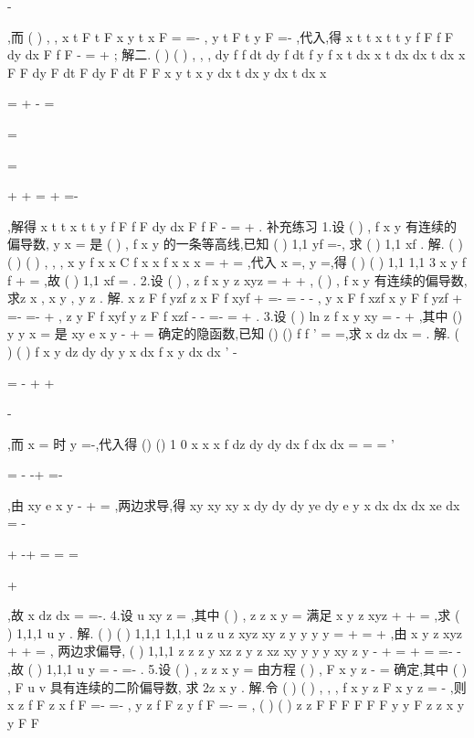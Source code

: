 \partial 
\partial 
-


,而 
(
)
, ,
x
t
F
t
F x y t
x
F
\partial 
=
\Rightarrow 
=-
\partial 
,
y
t
F
t
y
F
\partial =-
\partial 
,代入,得
x
t
t
x
t
t
y
f F
f F
dy
dx
F
f F
-
=
+
; 
解二.
(
)
(
)
,
, ,
dy
f
f dt
dy
f dt
f
y
f x t
dx
x
t dx
dx
t dx
x
F
F dy
F dt
F dy
F dt
F
F x y t
x
y dx
t dx
y dx
t dx
x
\partial 
\partial 
\partial 
\partial 


=
+
-
=


=

\partial 
\partial 
\partial 
\partial 



\Rightarrow 
\Rightarrow 



\partial 
\partial 
\partial 
\partial 
\partial 
\partial 
=



+
+
=
+
=-
\partial 
\partial 
\partial 
\partial 
\partial 
\partial 




,解得 
x
t
t
x
t
t
y
f F
f F
dy
dx
F
f F
-
=
+
. 
\textcolor{lyred}{补充练习 }
1.设
(
)
,
f x y 有连续的偏导数,
y
x
=
是
(
)
,
f x y 的一条等高线,已知
(
)
1,1
yf
=-, 
求
(
)
1,1
xf
. 
解. (
)
(
)
(
)
,
,
,
x
y
f x x
C
f
x x
f
x x
x
=
\Rightarrow 
+
\cdots 
=
,代入
x =,
y =,得 
(
)
(
)
1,1
1,1 3
x
y
f
f
+
\cdots =
,故
(
)
1,1
xf
=
. 
2.设
(
)
,
z
f x
y
z xyz
=
+
+
,
(
)
,
f x y 有连续的偏导数,求z
x
\partial 
\partial , x
y
\partial 
\partial , y
z
\partial 
\partial . 
解.
x
z
F
f
yzf
z
x
F
f
xyf
+
\partial =-
=
\partial 
-
-
,
y
x
F
f
xzf
x
y
F
f
yzf
+
\partial =-
=-
\partial 
+
,
z
y
F
f
xyf
y
z
F
f
xzf
-
-
\partial =-
=
\partial 
+
. 
3.设
(
)
ln
z
f x
y
xy
=
-
+
,其中
()
y
y x
=
是
xy
e
x
y
-
+
=
确定的隐函数,已知 
()
()
f
f '
=
=,求
x
dz
dx
=
. 
解.
(
)
(
)
f
x
y
dz
dy
dy
y
x
dx
f x
y
dx
dx
'
-


=
-
+
+


-


,而
x =
时
y =-,代入得 
()
()
1 0
x
x
x
f
dz
dy
dy
dx
f
dx
dx
=
=
=
'


=
-
-+
=-




,由
xy
e
x
y
-
+
=
,两边求导,得 
xy
xy
xy
x
dy
dy
dy
ye
dy
e
y
x dx
dx
dx
xe
dx
=
-


+
-+
=
\Rightarrow 
=
\Rightarrow 
=


+


,故
x
dz
dx
=
=-. 
4.设
u
xy z
=
,其中
(
)
,
z
z x y
=
满足
x
y
z
xyz
+
+
=
,求
(
)
1,1,1
u
y
\partial 
\partial 
. 
解.
(
)
(
)
1,1,1
1,1,1
u
z
u
z
xyz
xy z
y
y
y
y
\partial 
\partial 
\partial 
\partial 
=
+
\Rightarrow 
=
+
\partial 
\partial 
\partial 
\partial 
,由
x
y
z
xyz
+
+
=
, 
两边求偏导,
(
)
1,1,1
z
z
z
y
xz
z
y
z
xz
xy
y
y
y
xy
z
y
\partial 
\partial 
\partial 
-
\partial 
+
=
+
\Rightarrow 
=
\Rightarrow 
=-
\partial 
\partial 
\partial 
-
\partial 
,故 
(
)
1,1,1
u
y
\partial 
=
-
=-
\partial 
. 
5.设
(
)
,
z
z x y
=
由方程
(
)
,
F x
y z
-
=
确定,其中
(
)
,
F u v 具有连续的二阶偏导数, 
求
2z
x y
\partial 
\partial \partial . 
解.令
(
)
(
)
, ,
,
f x y z
F x
y z
=
-
,则
x
z
f
F
z
x
f
F
\partial =-
=-
\partial 
,
y
z
f
F
z
y
f
F
\partial =-
=
\partial 
, 
(
)
(
)
z
z
F
F
F
F
F
F
y
y
F
z
z
x y
y
F
F




